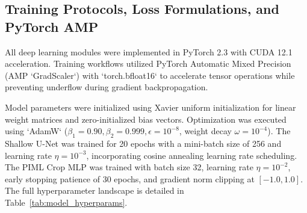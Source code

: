 \documentclass[sn-mathphys-num,Numbered]{sn-jnl}
\begin{document}
\subsection{Training Protocols, Loss Formulations, and PyTorch AMP}\label{sec:exp_training}
All deep learning modules were implemented in PyTorch 2.3 with CUDA 12.1 acceleration. Training workflows utilized PyTorch Automatic Mixed Precision (AMP `GradScaler`) with `torch.bfloat16` to accelerate tensor operations while preventing underflow during gradient backpropagation.

Model parameters were initialized using Xavier uniform initialization for linear weight matrices and zero-initialized bias vectors. Optimization was executed using `AdamW` ($\beta_1 = 0.90, \beta_2 = 0.999, \epsilon = 10^{-8}$, weight decay $\omega = 10^{-4}$). The Shallow U-Net was trained for 20 epochs with a mini-batch size of 256 and learning rate $\eta = 10^{-3}$, incorporating cosine annealing learning rate scheduling. The PIML Crop MLP was trained with batch size 32, learning rate $\eta = 10^{-2}$, early stopping patience of 30 epochs, and gradient norm clipping at $[-1.0, 1.0]$. The full hyperparameter landscape is detailed in Table~\ref{tab:model_hyperparams}.
\end{document}
